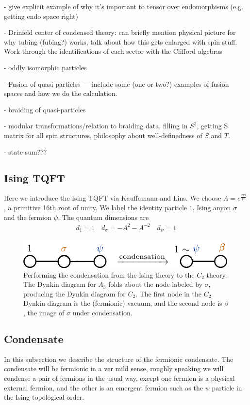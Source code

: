 \documentclass[12pt,a4paper]{article}
\begin{document}
- give explicit example of why it's important to tensor over endomorphisms (e.g. getting endo space right)

- Drinfeld center of condensed theory: can briefly mention physical picture for why tubing (fubing?) works, talk about how this gets enlarged with spin stuff. Work through the identifications of each sector with the Clifford algebras 

- oddly isomorphic particles

- Fusion of quasi-particles --- include some (one or two?) examples of fusion spaces and how we do the calculation. 

- braiding of quasi-particles 

- modular transformations/relation to braiding data, filling in $S^3$, getting S matrix for all spin structures, philosophy about well-definedness of $S$ and $T$. 

- state sum???


\subsection{Ising TQFT}
Here we introduce the Ising TQFT via Kauffamann and Lins\cite{Lins1994}. We choose $A = e^{\frac{2 \pi i}{16}}$, a primitive 16th root of unity. 
We label the identity particle $1$, Ising anyon $\sigma$ and the fermion $\psi$.
The quantum dimensions are
\begin{align}
d_1 = 1 \quad d_\sigma = -A^2 - A^{-2} \quad d_\psi =1 
\end{align}

\begin{figure}
\includegraphics{folding_A3.pdf}
\caption{Performing the condensation from the Ising theory to the $C_2$ theory. The Dynkin diagram for $A_3$ folds about the node labeled by $\sigma$, producing the Dynkin diagram 
for $C_2$. The first node in the $C_2$ Dynkin diagram is the (fermionic) vacuum, and the second node is $\beta$, the image of $\sigma$ under condensation. } 
\end{figure}


\subsection{Condensate}
In this subsection we describe the structure of the fermionic condensate. 
The condensate will be fermionic in a ver mild sense, roughly speaking we will condense a pair of fermions in the usual way, except one fermion is a physical external fermion, and the other is an emergent fermion such as the $\psi$ particle in the Ising topological order.
\end{document}
